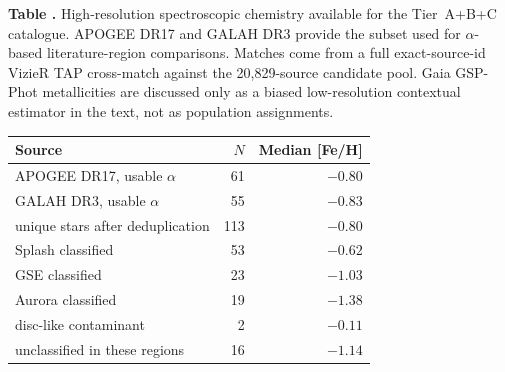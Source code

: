 \begin{center}
\label{tab:spectroscopic}
\begin{minipage}{\columnwidth}
\small\textbf{Table \thetable.} High-resolution spectroscopic chemistry
available for the Tier~A+B+C catalogue. APOGEE DR17
\citep{Abdurrauf2022} and GALAH DR3 \citep{Buder2021} provide the
subset used for $\alpha$-based literature-region comparisons. Matches
come from a full exact-source-id VizieR TAP cross-match against the
20{,}829-source candidate pool. Gaia GSP-Phot metallicities are
discussed only as a biased low-resolution contextual estimator in the
text, not as population assignments.
\end{minipage}
\vspace{0.4ex}

\small
\setlength{\tabcolsep}{4pt}
\begin{tabular}{lrr}
\hline\hline
Source & $N$ & Median [Fe/H] \\
\hline
APOGEE DR17, usable $\alpha$ & 61 & $-0.80$ \\
GALAH DR3, usable $\alpha$   & 55 & $-0.83$ \\
\quad{} unique stars after deduplication & 113 & $-0.80$ \\
\hline
Splash classified      &  53 & $-0.62$ \\
GSE classified          &  23 & $-1.03$ \\
Aurora classified       &  19 & $-1.38$ \\
disc-like contaminant   &   2 & $-0.11$ \\
unclassified in these regions & 16 & $-1.14$ \\
\hline
\end{tabular}
\end{center}
